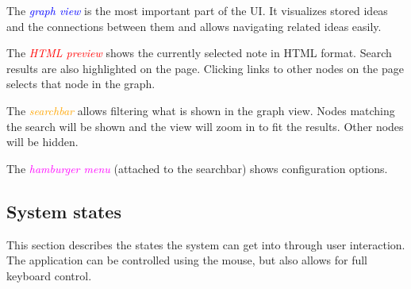 \documentclass{article}
\begin{document}
\begin{center}


\end{center}

The \textcolor{blue}{\emph{graph view}} is the most important part of the UI. It visualizes stored ideas and the connections between them and allows navigating related ideas easily.

The \textcolor{red}{\emph{HTML preview}} shows the currently selected note in HTML format. Search results are also highlighted on the page. Clicking links to other nodes on the page selects that node in the graph.

The \textcolor{orange}{\emph{searchbar}} allows filtering what is shown in the graph view. Nodes matching the search will be shown and the view will zoom in to fit the results. Other nodes will be hidden.

The \textcolor{magenta}{\emph{hamburger menu}} (attached to the searchbar) shows configuration options.

\newpage

\subsection{System states}

This section describes the states the system can get into through user interaction. The application can be controlled using the mouse, but also allows for full keyboard control.
\end{document}
